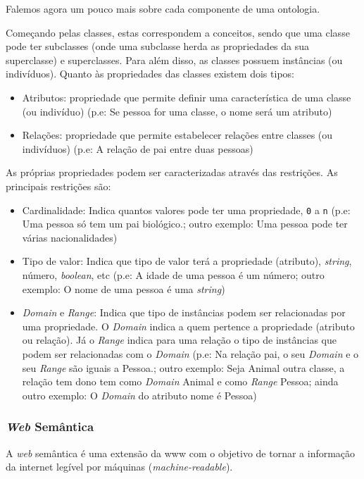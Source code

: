 Falemos agora um pouco mais sobre cada componente de uma ontologia.

Começando pelas classes, estas correspondem a conceitos, sendo que uma classe pode ter subclasses (onde uma subclasse herda as propriedades da sua superclasse) e superclasses. Para além disso, as classes possuem instâncias (ou indivíduos). Quanto às propriedades das classes existem dois tipos:
\begin{itemize}
    \item Atributos: propriedade que permite definir uma característica de uma classe (ou indivíduo) (p.e: Se pessoa for uma classe, o nome será um atributo)
    \item Relações: propriedade que permite estabelecer relações entre classes (ou indivíduos) (p.e: A relação de pai entre duas pessoas) 
\end{itemize}

As próprias propriedades podem ser caracterizadas através das restrições. As principais restrições são:
\begin{itemize}
    \item Cardinalidade: Indica quantos valores pode ter uma propriedade, \texttt{0} a \texttt{n} (p.e: Uma pessoa só tem um pai biológico.; outro exemplo: Uma pessoa pode ter várias nacionalidades)
    \item Tipo de valor: Indica que tipo de valor terá a propriedade (atributo), \textit{string}, número, \textit{boolean}, etc (p.e: A idade de uma pessoa é um número; outro exemplo: O nome de uma pessoa é uma \textit{string})
    \item \textit{Domain} e \textit{Range}: Indica que tipo de instâncias podem ser relacionadas por uma propriedade. O \textit{Domain} indica a quem pertence a propriedade (atributo ou relação). Já o \textit{Range} indica para uma relação o tipo de instâncias que podem ser relacionadas com o \textit{Domain} (p.e: Na relação pai, o seu \textit{Domain} e o seu \textit{Range} são iguais a Pessoa.; outro exemplo: Seja Animal outra classe, a relação tem dono tem como \textit{Domain} Animal e como \textit{Range} Pessoa; ainda outro exemplo: O \textit{Domain} do atributo nome é Pessoa)
\end{itemize}

\subsubsection{\textit{Web} Semântica}

A \textit{web} semântica é uma extensão da \acrshort{www} com o objetivo de tornar a informação da internet legível por máquinas (\textit{machine-readable}).

